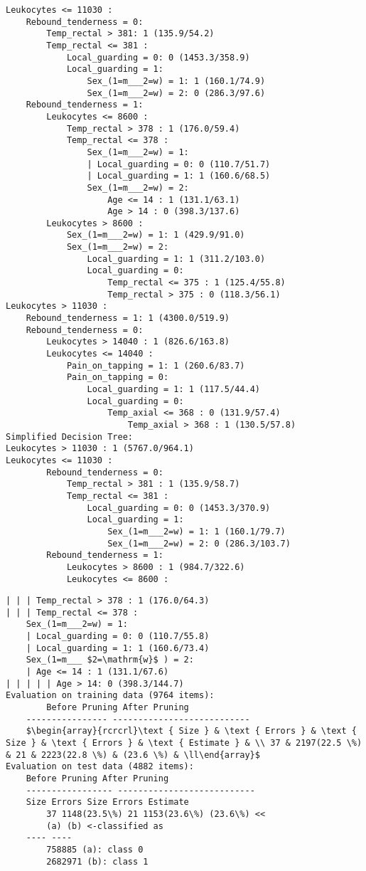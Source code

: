 \documentclass[10pt]{article}
\begin{document}
\begin{verbatim}
Leukocytes <= 11030 :
    Rebound_tenderness = 0:
        Temp_rectal > 381: 1 (135.9/54.2)
        Temp_rectal <= 381 :
            Local_guarding = 0: 0 (1453.3/358.9)
            Local_guarding = 1:
                Sex_(1=m___2=w) = 1: 1 (160.1/74.9)
                Sex_(1=m___2=w) = 2: 0 (286.3/97.6)
    Rebound_tenderness = 1:
        Leukocytes <= 8600 :
            Temp_rectal > 378 : 1 (176.0/59.4)
            Temp_rectal <= 378 :
                Sex_(1=m___2=w) = 1:
                | Local_guarding = 0: 0 (110.7/51.7)
                | Local_guarding = 1: 1 (160.6/68.5)
                Sex_(1=m___2=w) = 2:
                    Age <= 14 : 1 (131.1/63.1)
                    Age > 14 : 0 (398.3/137.6)
        Leukocytes > 8600 :
            Sex_(1=m___2=w) = 1: 1 (429.9/91.0)
            Sex_(1=m___2=w) = 2:
                Local_guarding = 1: 1 (311.2/103.0)
                Local_guarding = 0:
                    Temp_rectal <= 375 : 1 (125.4/55.8)
                    Temp_rectal > 375 : 0 (118.3/56.1)
Leukocytes > 11030 :
    Rebound_tenderness = 1: 1 (4300.0/519.9)
    Rebound_tenderness = 0:
        Leukocytes > 14040 : 1 (826.6/163.8)
        Leukocytes <= 14040 :
            Pain_on_tapping = 1: 1 (260.6/83.7)
            Pain_on_tapping = 0:
                Local_guarding = 1: 1 (117.5/44.4)
                Local_guarding = 0:
                    Temp_axial <= 368 : 0 (131.9/57.4)
                        Temp_axial > 368 : 1 (130.5/57.8)
Simplified Decision Tree:
Leukocytes > 11030 : 1 (5767.0/964.1)
Leukocytes <= 11030 :
        Rebound_tenderness = 0:
            Temp_rectal > 381 : 1 (135.9/58.7)
            Temp_rectal <= 381 :
                Local_guarding = 0: 0 (1453.3/370.9)
                Local_guarding = 1:
                    Sex_(1=m___2=w) = 1: 1 (160.1/79.7)
                    Sex_(1=m___2=w) = 2: 0 (286.3/103.7)
        Rebound_tenderness = 1:
            Leukocytes > 8600 : 1 (984.7/322.6)
            Leukocytes <= 8600 :
\end{verbatim}

\begin{verbatim}
| | | Temp_rectal > 378 : 1 (176.0/64.3)
| | | Temp_rectal <= 378 :
    Sex_(1=m___2=w) = 1:
    | Local_guarding = 0: 0 (110.7/55.8)
    | Local_guarding = 1: 1 (160.6/73.4)
    Sex_(1=m___ $2=\mathrm{w}$ ) = 2:
    | Age <= 14 : 1 (131.1/67.6)
| | | | | Age > 14: 0 (398.3/144.7)
Evaluation on training data (9764 items):
        Before Pruning After Pruning
    ---------------- ---------------------------
    $\begin{array}{rcrcrl}\text { Size } & \text { Errors } & \text { Size } & \text { Errors } & \text { Estimate } & \\ 37 & 2197(22.5 \%) & 21 & 2223(22.8 \%) & (23.6 \%) & \ll\end{array}$
Evaluation on test data (4882 items):
    Before Pruning After Pruning
    ----------------- ---------------------------
    Size Errors Size Errors Estimate
        37 1148(23.5\%) 21 1153(23.6\%) (23.6\%) <<
        (a) (b) <-classified as
    ---- ----
        758885 (a): class 0
        2682971 (b): class 1
\end{verbatim}
\end{document}
